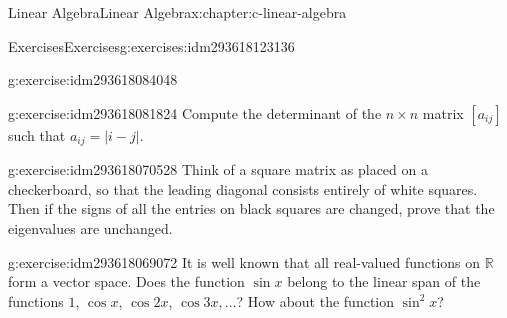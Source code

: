 \documentclass[twoside,10pt,]{book}
\numberwithin{equation}{section}
\begin{document}
\begin{chapterptx}{Linear Algebra}{}{Linear Algebra}{}{}{x:chapter:c-linear-algebra}
\begin{exercises-section}{Exercises}{}{Exercises}{}{}{g:exercises:idm293618123136}
\begin{divisionexercise}{8}{}{}{g:exercise:idm293618084048}
\end{divisionexercise}%
\begin{divisionexercise}{9}{}{}{g:exercise:idm293618081824}%
Compute the determinant of the \(n \times  n\) matrix \(\left[a_{i j}\right]\) such that \(a_{i j} =\lvert i-j\rvert\).%
\end{divisionexercise}%
\begin{divisionexercise}{10}{}{}{g:exercise:idm293618070528}%
Think of a square matrix as placed on a checkerboard, so that the leading diagonal consists entirely of white squares. Then if the signs of all the entries on black squares are changed, prove that the eigenvalues are unchanged.%
\end{divisionexercise}%
\begin{divisionexercise}{11}{}{}{g:exercise:idm293618069072}%
It is well known that all real-valued functions on \(\mathbb{R}\) form a vector space. Does the function \(\sin  x\) belong to the linear span of the functions \(1\), \(\cos x\), \(\cos 2 x\), \(\cos 3 x,\ldots\)?    How about the function \(\sin^2 x\)?%
\end{divisionexercise}%
\end{exercises-section}
\end{chapterptx}
%
%
\typeout{************************************************}
\typeout{************************************************}
%
\end{document}
